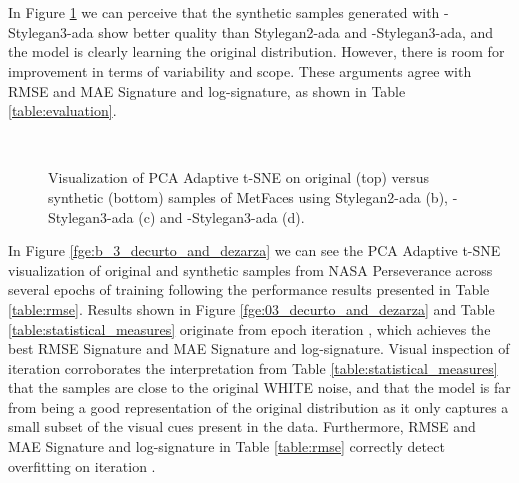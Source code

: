 \documentclass[lettersize,journal]{IEEEtran}
\begin{document}
\begin{figure*}[ht]
\centering
{}
\\
\\
\caption{Visualization of PCA Adaptive t-SNE on original (left) versus synthetic (right) samples of AFHQ Cat (a,b), Dog (c,d) and Wild (e,f) using Stylegan2-ada.}
\label{fge:b_decurto_and_dezarza}
\end{figure*}

In Figure \ref{fge:b_2_decurto_and_dezarza} we can perceive that the synthetic samples generated with -Stylegan3-ada show better quality than Stylegan2-ada and -Stylegan3-ada, and the model is clearly learning the original distribution. However, there is room for improvement in terms of variability and scope. These arguments agree with RMSE and MAE Signature and log-signature, as shown in Table \ref{table:evaluation}. 

\begin{figure}[ht]
\centering
{}\\
\caption{Visualization of PCA Adaptive t-SNE on original (top) versus synthetic (bottom) samples of MetFaces using Stylegan2-ada (b), -Stylegan3-ada (c) and -Stylegan3-ada (d).}
\label{fge:b_2_decurto_and_dezarza}
\end{figure}

In Figure \ref{fge:b_3_decurto_and_dezarza} we can see the PCA Adaptive t-SNE visualization of original and synthetic samples from NASA Perseverance across several epochs of training following the performance results presented in Table \ref{table:rmse}. Results shown in Figure \ref{fge:03_decurto_and_dezarza} and Table \ref{table:statistical_measures} originate from epoch iteration , which achieves the best RMSE Signature and MAE Signature and log-signature. Visual inspection of iteration  corroborates the interpretation from Table \ref{table:statistical_measures} that the samples are close to the original WHITE noise, and that the model is far from being a good representation of the original distribution as it only captures a small subset of the visual cues present in the data. Furthermore, RMSE and MAE Signature and log-signature in Table \ref{table:rmse} correctly detect overfitting on iteration .
\end{document}
